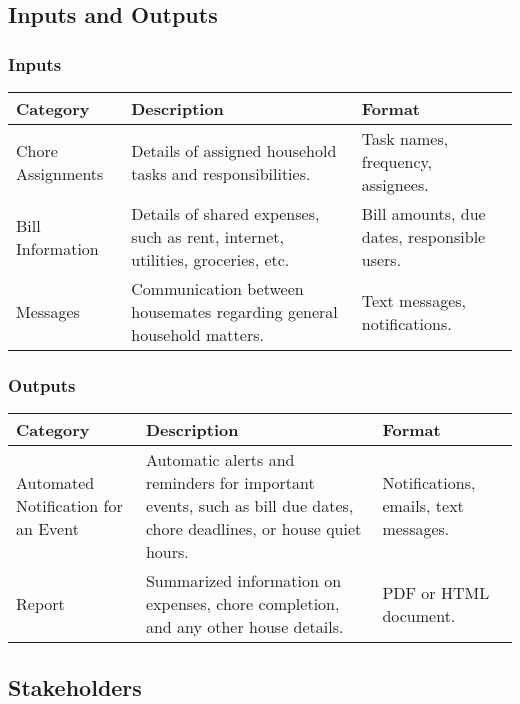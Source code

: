 \documentclass{article}
\begin{document}
\subsection{Inputs and Outputs}

\subsubsection{Inputs}
\begin{center}
\begin{tabular}{|p{4cm}|p{4.5cm}|p{3.5cm}|}
\hline
\textbf{Category} & \textbf{Description} & \textbf{Format} \\
\hline
Chore Assignments & Details of assigned household tasks and responsibilities. & Task names, frequency, assignees. \\
\hline
Bill Information & Details of shared expenses, such as rent, internet, utilities, groceries, etc. & Bill amounts, due dates, responsible users. \\
\hline
Messages & Communication between housemates regarding general household matters. & Text messages, notifications. \\
\hline
\end{tabular}
\end{center}

\subsubsection{Outputs}
\begin{center}
\begin{tabular}{|p{4cm}|p{4.5cm}|p{3.5cm}|}
\hline
\textbf{Category} & \textbf{Description} & \textbf{Format} \\
\hline
Automated Notification for an Event & Automatic alerts and reminders for important events, such as bill due dates, chore deadlines, or house quiet hours. & Notifications, emails, text messages. \\
\hline
Report & Summarized information on expenses, chore completion, and any other house details. & PDF or HTML document. \\
\hline
\end{tabular}
\end{center}

\subsection{Stakeholders}
\end{document}
